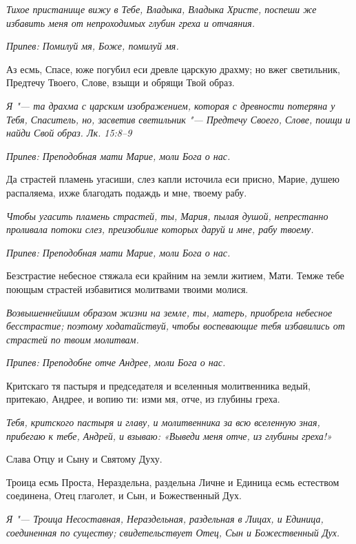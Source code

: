 \itshape Тихое пристанище вижу в Тебе, Владыка, Владыка Христе, поспеши же избавить меня от непроходимых глубин греха и отчаяния.\normalfont{}


\itshape Припев:\normalfont{} Помилуй мя, Боже, помилуй мя.


Аз есмь, Спасе, юже погубил еси древле царскую драхму; но вжег светильник, Предтечу Твоего, Слове, взыщи и обрящи Твой образ.


\itshape Я "--- та драхма с царским изображением, которая с древности потеряна у Тебя, Спаситель, но, засветив светильник "--- Предтечу Своего, Слове, поищи и найди Свой образ. Лк. 15:8–9\normalfont{}


\itshape Припев:\normalfont{} Преподобная мати Марие, моли Бога о нас.


Да страстей пламень угасиши, слез капли источила еси присно, Марие, душею распаляема, ихже благодать подаждь и мне, твоему рабу.


\itshape Чтобы угасить пламень страстей, ты, Мария, пылая душой, непрестанно проливала потоки слез, преизобилие которых даруй и мне, рабу твоему.\normalfont{}


\itshape Припев:\normalfont{} Преподобная мати Марие, моли Бога о нас.


Безстрастие небесное стяжала еси крайним на земли житием, Мати. Темже тебе поющым страстей избавитися молитвами твоими молися.


\itshape Возвышеннейшим образом жизни на земле, ты, матерь, приобрела небесное бесстрастие; поэтому ходатайствуй, чтобы воспевающие тебя избавились от страстей по твоим молитвам.\normalfont{}


\itshape Припев:\normalfont{} Преподобне отче Андрее, моли Бога о нас.


Критскаго тя пастыря и председателя и вселенныя молитвенника ведый, притекаю, Андрее, и вопию ти: изми мя, отче, из глубины греха.


\itshape Тебя, критского пастыря и главу, и молитвенника за всю вселенную зная, прибегаю к тебе, Андрей, и взываю: «Выведи меня отче, из глубины греха!»\normalfont{}


Слава Отцу и Сыну и Святому Духу.


Троица есмь Проста, Нераздельна, раздельна Личне и Единица есмь естеством соединена, Отец глаголет, и Сын, и Божественный Дух.


\itshape Я "--- Троица Несоставная, Нераздельная, раздельная в Лицах, и Единица, соединенная по существу; свидетельствует Отец, Сын и Божественный Дух.\normalfont{}



